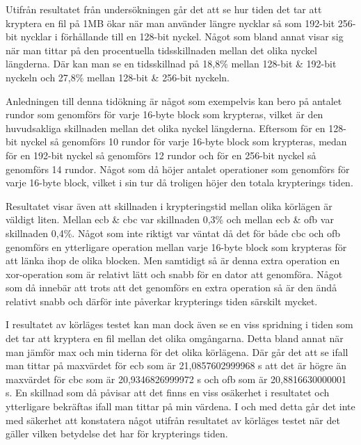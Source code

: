 \label{chap:discussion}

Utifrån resultatet från undersökningen går det att se hur tiden det tar att kryptera en fil på 1MB ökar när man använder längre nycklar så som 192-\gls{bit} 256-\gls{bit} nycklar
i förhållande till en 128-\gls{bit} nyckel. Något som bland annat visar sig när man tittar på den procentuella tidsskillnaden mellan det olika nyckel längderna. Där kan man se en
tidsskillnad på 18,8\% mellan 128-\gls{bit} \& 192-\gls{bit} nyckeln och 27,8\% mellan 128-\gls{bit} \& 256-\gls{bit} nyckeln.

Anledningen till denna tidökning är något som exempelvis kan bero på antalet rundor som genomförs för varje 16-\gls{byte} block som krypteras, vilket är den huvudsakliga
skillnaden mellan det olika nyckel längderna. Eftersom för en 128-\gls{bit} nyckel så genomförs 10 rundor för varje 16-\gls{byte} block som krypteras, medan för en 192-\gls{bit}
nyckel så genomförs 12 rundor och för en 256-\gls{bit} nyckel så genomförs 14 rundor. Något som då höjer antalet operationer som genomförs för varje 16-\gls{byte} block, vilket
i sin tur då troligen höjer den totala krypterings tiden.

Resultatet visar även att skillnaden i krypteringstid mellan olika körlägen är väldigt liten. Mellan \acrshort{ecb} \& \acrshort{cbc} var skillnaden 0,3\% och mellan \acrshort{ecb}
\& \acrshort{ofb} var skillnaden 0,4\%. Något som inte riktigt var väntat då det för både \acrshort{cbc} och \acrshort{ofb}
genomförs en ytterligare operation mellan varje 16-\gls{byte} block som krypteras för att länka ihop de olika blocken. Men samtidigt så är denna extra operation en \gls{xor}-operation
som är relativt lätt och snabb för en dator att genomföra. Något som då innebär att trots att det genomförs en extra operation så är den ändå relativt snabb och därför inte
påverkar krypterings tiden särskilt mycket.

I resultatet av körläges testet kan man dock även se en viss spridning i tiden som det tar att kryptera en fil mellan det olika omgångarna. Detta bland annat när man jämför
max och min tiderna för det olika körlägena. Där går det att se ifall man tittar på maxvärdet för \acrshort{ecb} som är 21,0857602999968 s att det är högre än
maxvärdet för \acrshort{cbc} som är 20,9346826999972 s och \acrshort{ofb} som är 20,8816630000001 s. En skillnad som då påvisar att det finns en viss osäkerhet i
resultatet och ytterligare bekräftas ifall man tittar på min värdena. I och med detta går det inte med säkerhet att konstatera något utifrån resultatet av körläges testet
när det gäller vilken betydelse det har för krypterings tiden.


